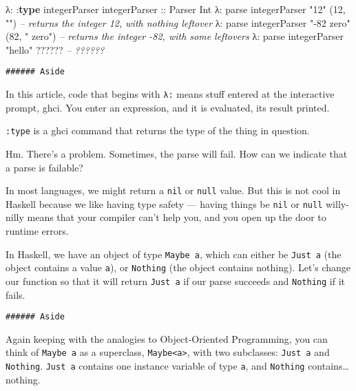 \documentclass[]{article}
\newenvironment{Shaded}{}{}
\newcommand{\KeywordTok}[1]{\textcolor[rgb]{0.00,0.44,0.13}{\textbf{{#1}}}}
\newcommand{\DataTypeTok}[1]{\textcolor[rgb]{0.56,0.13,0.00}{{#1}}}
\newcommand{\DecValTok}[1]{\textcolor[rgb]{0.25,0.63,0.44}{{#1}}}
\newcommand{\StringTok}[1]{\textcolor[rgb]{0.25,0.44,0.63}{{#1}}}
\newcommand{\CommentTok}[1]{\textcolor[rgb]{0.38,0.63,0.69}{\textit{{#1}}}}
\newcommand{\OtherTok}[1]{\textcolor[rgb]{0.00,0.44,0.13}{{#1}}}
\newcommand{\FunctionTok}[1]{\textcolor[rgb]{0.02,0.16,0.49}{{#1}}}
\newcommand{\NormalTok}[1]{{#1}}
\begin{document}
\begin{Shaded}
\begin{Highlighting}[]
\NormalTok{λ}\FunctionTok{:} \FunctionTok{:}\KeywordTok{type} \NormalTok{integerParser}
\OtherTok{integerParser ::} \DataTypeTok{Parser} \DataTypeTok{Int}
\NormalTok{λ}\FunctionTok{:} \NormalTok{parse integerParser }\StringTok{"12"}
\NormalTok{(}\DecValTok{12}\NormalTok{, }\StringTok{""}\NormalTok{)                    }\CommentTok{-- returns the integer 12, with nothing leftover}
\NormalTok{λ}\FunctionTok{:} \NormalTok{parse integerParser }\StringTok{"-82 zero"}
\NormalTok{(}\DecValTok{82}\NormalTok{, }\StringTok{" zero"}\NormalTok{)               }\CommentTok{-- returns the integer -82, with some leftovers}
\NormalTok{λ}\FunctionTok{:} \NormalTok{parse integerParser }\StringTok{"hello"}
\FunctionTok{??????}                      \CommentTok{-- ??????}
\end{Highlighting}
\end{Shaded}

\begin{verbatim}
###### Aside
\end{verbatim}

In this article, code that begins with \texttt{λ:} means stuff entered
at the interactive prompt, ghci. You enter an expression, and it is
evaluated, its result printed.

\texttt{:type} is a ghci command that returns the type of the thing in
question.

Hm. There's a problem. Sometimes, the parse will fail. How can we
indicate that a parse is failable?

In most languages, we might return a \texttt{nil} or \texttt{null}
value. But this is not cool in Haskell because we like having type
safety --- having things be \texttt{nil} or \texttt{null} willy-nilly
means that your compiler can't help you, and you open up the door to
runtime errors.

In Haskell, we have an object of type \texttt{Maybe\ a}, which can
either be \texttt{Just\ a} (the object contains a value \texttt{a}), or
\texttt{Nothing} (the object contains nothing). Let's change our
function so that it will return \texttt{Just\ a} if our parse succeeds
and \texttt{Nothing} if it fails.

\begin{verbatim}
###### Aside
\end{verbatim}

Again keeping with the analogies to Object-Oriented Programming, you can
think of \texttt{Maybe\ a} as a superclass,
\texttt{Maybe\textless{}a\textgreater{}}, with two subclasses:
\texttt{Just\ a} and \texttt{Nothing}. \texttt{Just\ a} contains one
instance variable of type \texttt{a}, and \texttt{Nothing}
contains\ldots{}nothing.
\end{document}
